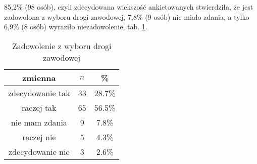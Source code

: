 85,2\% (98 osób), czyli zdecydowana wiekszość ankietowanych stwierdziła, że jest zadowolona z wyboru drogi zawodowej, 7,8\% (9 osób) nie miało zdania, a tylko 6,9\% (8 osób) wyraziło niezadowolenie, tab. \ref{tab:Q5}.

\begin{table}[H]
\caption{Zadowolenie z wyboru drogi zawodowej}
\centering
\begin{tabular}{ | c | c | c |}
\hline
zmienna & $n$ & \% \\
\hline
zdecydowanie tak  &  33  & 28.7\% \\
\hline
raczej tak  &  65  & 56.5\% \\
\hline
nie mam zdania  &  9  & 7.8\% \\
\hline
raczej nie  &  5  & 4.3\% \\
\hline
zdecydowanie nie  &  3  & 2.6\% \\
\hline
\end{tabular}
\label{tab:Q5}
\end{table}

